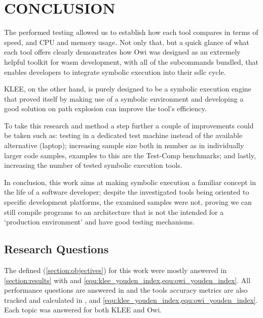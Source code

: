 \chapter{CONCLUSION}\label{chap:conclusion}

The performed testing allowed us to establish how each tool compares in terms of speed, and CPU and memory usage. Not only that, but a quick glance of what each tool offers clearly demonstrates how Owi was designed as an extremely helpful toolkit for \acrshort{wasm} development, with all of the subcommands bundled, that enables developers to integrate symbolic execution into their \gls{sdlc} cycle.%

KLEE, on the other hand, is purely designed to be a symbolic execution engine that proved itself by making use of a symbolic environment and developing a good solution on path explosion can improve the tool's efficiency.

To take this research and method a step further a couple of improvements could be taken such as: testing in a dedicated test machine instead of the available alternative (laptop); increasing sample size both in number as in individually larger code samples, examples to this are the Test-Comp benchmarks; and lastly, increasing the number of tested symbolic execution tools.

In conclusion, this work aims at making symbolic execution a familiar concept in the life of a software developer; despite the investigated tools being oriented to specific development platforms, the examined samples were not, proving we can still compile programs to an architecture that is not the intended for a `production environment' and have good testing mechanisms.

\section{Research Questions}

The defined  (\cref{section:objectives}) for this work were mostly answered in \cref{section:results}  with  and \cref{equ:klee_youden_index,equ:owi_youden_index}. All performance questions are answered in  and the tools accuracy metrics are also tracked and calculated in , and \cref{equ:klee_youden_index,equ:owi_youden_index}. Each topic was answered for both KLEE and Owi.

